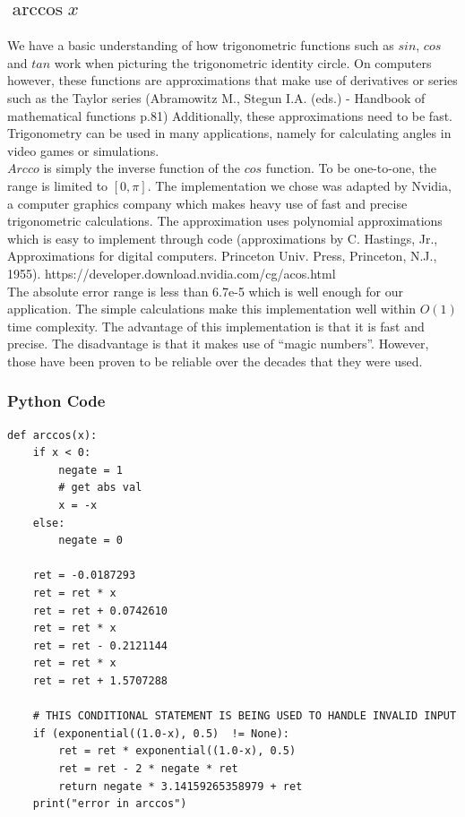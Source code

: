 \documentclass[11pt,onside]{report}
\begin{document}
\subsection{$\arccos{x}$}
We have a basic understanding of how trigonometric functions such as $sin$, $cos$ and $tan$ work when picturing the trigonometric identity circle. On computers however, these functions are approximations that make use of derivatives or series such as the Taylor series (Abramowitz M., Stegun I.A. (eds.) - Handbook of mathematical functions p.81) Additionally, these approximations need to be fast. Trigonometry can be used in many applications, namely for calculating angles in video games or simulations. \\

$Arcco$ is simply the inverse function of the $cos$ function. To be one-to-one, the range is limited to $[0,\pi]$. The implementation we chose was adapted by Nvidia, a computer graphics company which makes heavy use of fast and precise trigonometric calculations. The approximation uses polynomial approximations which is easy to implement through code (approximations by C. Hastings, Jr., Approximations for digital computers. Princeton Univ. Press, Princeton, N.J., 1955). https://developer.download.nvidia.com/cg/acos.html \\

The absolute error range is less than 6.7e-5 which is well enough for our application. The simple calculations make this implementation well within $O(1)$ time complexity. The advantage of this implementation is that it is fast and precise. The disadvantage is that it makes use of “magic numbers”. However, those have been proven to be reliable over the decades that they were used.

\subsubsection{Python Code}
\begin{lstlisting}
def arccos(x):
    if x < 0:
        negate = 1
        # get abs val
        x = -x
    else:
        negate = 0

    ret = -0.0187293
    ret = ret * x
    ret = ret + 0.0742610
    ret = ret * x
    ret = ret - 0.2121144
    ret = ret * x
    ret = ret + 1.5707288
    
    # THIS CONDITIONAL STATEMENT IS BEING USED TO HANDLE INVALID INPUT
    if (exponential((1.0-x), 0.5)  != None):
        ret = ret * exponential((1.0-x), 0.5)
        ret = ret - 2 * negate * ret
        return negate * 3.14159265358979 + ret
    print("error in arccos")
\end{lstlisting}
\end{document}
